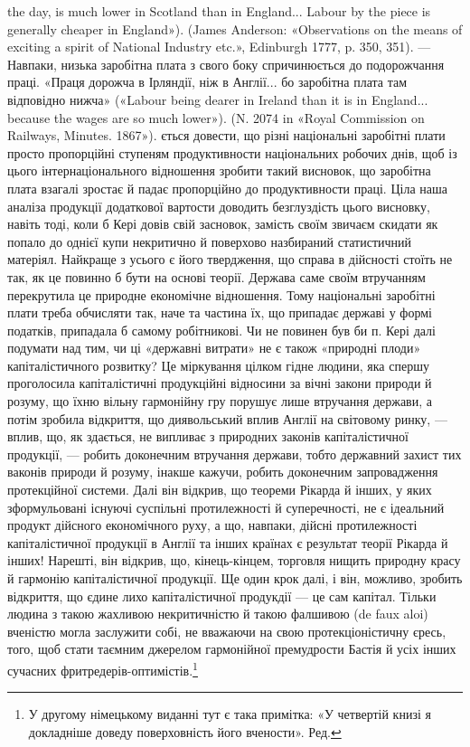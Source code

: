 the day, is much lower in Scotland than in England... Labour by the piece
is generally cheaper in England»). (James Anderson: «Observations on
the means of exciting a spirit of National Industry etc.», Edinburgh 1777,
p. 350, 351). — Навпаки, низька заробітна плата з свого боку спричинюється
до подорожчання праці. «Праця дорожча в Ірляндії, ніж в Англії...
бо заробітна плата там відповідно нижча» («Labour being dearer in Ireland
than it is in England... because the wages are so much lower»).
(N. 2074 in «Royal Commission on Railways, Minutes. 1867»).
ється довести, що різні національні заробітні плати просто пропорційні
ступеням продуктивности національних робочих днів,
щоб із цього інтернаціонального відношення зробити такий висновок,
що заробітна плата взагалі зростає й падає пропорційно
до продуктивности праці. Ціла наша аналіза продукції додаткової
вартости доводить безглуздість цього висновку, навіть тоді,
коли б Кері довів свій засновок, замість своїм звичаєм скидати
як попало до однієї купи некритично й поверхово назбираний
статистичний матеріял. Найкраще з усього є його твердження,
що справа в дійсності стоїть не так, як це повинно б бути на
основі теорії. Держава саме своїм втручанням перекрутила це природне
економічне відношення. Тому національні заробітні плати
треба обчисляти так, наче та частина їх, що припадає державі
у формі податків, припадала б самому робітникові. Чи не повинен
був би п. Кері далі подумати над тим, чи ці «державні витрати»
не є також «природні плоди» капіталістичного розвитку? Це міркування
цілком гідне людини, яка спершу проголосила капіталістичні
продукційні відносини за вічні закони природи й розуму,
що їхню вільну гармонійну гру порушує лише втручання держави,
а потім зробила відкриття, що диявольський вплив Англії
на світовому ринку, — вплив, що, як здається, не випливає з
природних законів капіталістичної продукції, — робить доконечним
втручання держави, тобто державний захист тих ваконів
природи й розуму, інакше кажучи, робить доконечним запровадження
протекційної системи. Далі він відкрив, що теореми
Рікарда й інших, у яких зформульовані існуючі суспільні протилежності
й суперечності, не є ідеальний продукт дійсного економічного
руху, а що, навпаки, дійсні протилежності капіталістичної
продукції в Англії та інших країнах є результат теорії
Рікарда й інших! Нарешті, він відкрив, що, кінець-кінцем,
торговля нищить природну красу й гармонію капіталістичної
продукції. Ще один крок далі, і він, можливо, зробить відкриття,
що єдине лихо капіталістичної продукдії — це сам капітал.
Тільки людина з такою жахливою некритичністю й такою фалшивою
(de faux aloi) вченістю могла заслужити собі, не вважаючи
на свою протекціоністичну єресь, того, щоб стати таємним джерелом
гармонійної премудрости Бастія й усіх інших сучасних
фритредерів-оптимістів.\footnote*{
У другому німецькому виданні тут є така примітка: «У четвертій
книзі я докладніше доведу поверховність його вчености». Ред.
}
